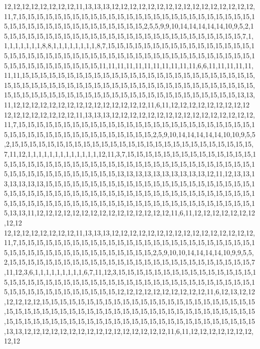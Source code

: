 12,12,12,12,12,12,12,12,11,13,13,13,12,12,12,12,12,12,12,12,12,12,12,12,12,12,12,12,11,7,15,15,15,15,15,15,15,15,15,15,15,15,15,15,15,15,15,15,15,15,15,15,15,15,15,15,15,15,15,15,15,15,15,15,15,15,15,15,15,15,15,15,2,5,5,9,9,10,14,14,14,14,14,10,9,5,2,15,15,15,15,15,15,15,15,15,15,15,15,15,15,15,15,15,15,15,15,15,15,15,15,15,15,15,7,1,1,1,1,1,1,1,1,8,8,1,1,1,1,1,1,1,1,8,7,15,15,15,15,15,15,15,15,15,15,15,15,15,15,15,15,15,15,15,15,15,15,15,15,15,15,15,15,15,15,15,15,15,15,15,15,15,15,15,15,15,15,15,15,15,15,15,15,15,15,15,15,15,15,15,11,11,11,11,11,11,11,11,11,11,11,6,6,11,11,11,11,11,11,11,15,15,15,15,15,15,15,15,15,15,15,15,15,15,15,15,15,15,15,15,15,15,15,15,15,15,15,15,15,15,15,15,15,15,15,15,15,15,15,15,15,15,15,15,15,15,15,15,15,15,15,15,15,15,15,15,15,15,15,15,15,15,15,15,15,15,15,15,15,15,15,15,15,15,15,15,15,15,15,15,13,13,11,12,12,12,12,12,12,12,12,12,12,12,12,12,12,12,11,6,11,12,12,12,12,12,12,12,12,12
12,12,12,12,12,12,12,12,11,13,13,13,12,12,12,12,12,12,12,12,12,12,12,12,12,12,12,12,11,7,15,15,15,15,15,15,15,15,15,15,15,15,15,15,15,15,15,15,15,15,15,15,15,15,15,15,15,15,15,15,15,15,15,15,15,15,15,15,15,15,15,15,15,2,5,9,10,14,14,14,14,14,10,10,9,5,5,2,15,15,15,15,15,15,15,15,15,15,15,15,15,15,15,15,15,15,15,15,15,15,15,15,15,15,15,7,11,12,1,1,1,1,1,1,1,1,1,1,1,1,1,12,11,3,7,15,15,15,15,15,15,15,15,15,15,15,15,15,15,15,15,15,15,15,15,15,15,15,15,15,15,15,15,15,15,15,15,15,15,15,15,15,15,15,15,15,15,15,15,15,15,15,15,15,15,15,15,15,15,15,13,13,13,13,13,13,13,13,13,13,12,11,12,13,13,13,13,13,13,13,15,15,15,15,15,15,15,15,15,15,15,15,15,15,15,15,15,15,15,15,15,15,15,15,15,15,15,15,15,15,15,15,15,15,15,15,15,15,15,15,15,15,15,15,15,15,15,15,15,15,15,15,15,15,15,15,15,15,15,15,15,15,15,15,15,15,15,15,15,15,15,15,15,15,15,15,15,15,15,15,13,13,11,12,12,12,12,12,12,12,12,12,12,12,12,12,12,12,11,6,11,12,12,12,12,12,12,12,12,12
12,12,12,12,12,12,12,12,11,13,13,13,12,12,12,12,12,12,12,12,12,12,12,12,12,12,12,12,11,7,15,15,15,15,15,15,15,15,15,15,15,15,15,15,15,15,15,15,15,15,15,15,15,15,15,15,15,15,15,15,15,15,15,15,15,15,15,15,15,15,15,15,15,2,5,9,10,10,14,14,14,14,10,9,9,5,5,2,15,15,15,15,15,15,15,15,15,15,15,15,15,15,15,15,15,15,15,15,15,15,15,15,15,15,15,7,11,12,3,6,1,1,1,1,1,1,1,1,1,6,7,11,12,3,15,15,15,15,15,15,15,15,15,15,15,15,15,15,15,15,15,15,15,15,15,15,15,15,15,15,15,15,15,15,15,15,15,15,15,15,15,15,15,15,15,15,15,15,15,15,15,15,15,15,15,15,15,15,15,15,12,12,12,12,12,12,12,12,12,12,11,6,12,13,12,12,12,12,12,12,15,15,15,15,15,15,15,15,15,15,15,15,15,15,15,15,15,15,15,15,15,15,15,15,15,15,15,15,15,15,15,15,15,15,15,15,15,15,15,15,15,15,15,15,15,15,15,15,15,15,15,15,15,15,15,15,15,15,15,15,15,15,15,15,15,15,15,15,15,15,15,15,15,15,15,15,15,15,15,15,13,13,12,12,12,12,12,12,12,12,12,12,12,12,12,12,12,12,11,6,11,12,12,12,12,12,12,12,12,12
